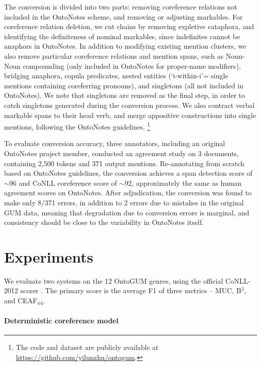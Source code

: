 \documentclass[11pt,a4paper]{article}
\begin{document}
The conversion is divided into two parts: removing coreference relations not included in the OntoNotes scheme, and removing or adjusting markables. For coreference relation deletion, we cut chains by removing expletive cataphora, and identifying the definiteness of nominal markables, since indefinites cannot be anaphors in OntoNotes. In addition to modifying existing mention clusters, we also remove particular coreference relations and mention spans, such as Noun-Noun compounding (only included in OntoNotes for proper-name modifiers), bridging anaphora, copula predicates, nested entities (`i-within-i'= single mentions containing coreferring pronouns), and singletons (all not included in OntoNotes). We note that singletons are removed as the final step, in order to catch singletons generated during the conversion process. We also contract verbal markable spans to their head verb, and merge appositive constructions into single mentions, following the OntoNotes guidelines.
\footnote{The code and dataset are publicly available at \url{https://github.com/yilunzhu/ontogum}.}

To evaluate conversion accuracy, three annotators, including an original OntoNotes project member, conducted an agreement study on 3 documents, containing 2,500 tokens and 371 output mentions. Re-annotating from scratch based on OntoNotes guidelines, the conversion achieves a span detection score of $\sim$96 and CoNLL coreference score of $\sim$92, approximately the same as human agreement scores on OntoNotes. After adjudication, the conversion was found to make only 8/371 errors, in addition to 2 errors due to mistakes in the original GUM data, meaning that degradation due to conversion errors is marginal, and consistency should be close to the variability in OntoNotes itself.







\section{Experiments}
We evaluate two systems on the 12 OntoGUM genres, using the official CoNLL-2012 scorer \cite{pradhan-etal-2012-conll, pradhan-etal-2014-scoring}. The primary score is the average F1 of three metrics -- MUC, B$^3$, and CEAF$_{\phi4}$.

\paragraph{Deterministic coreference model}
\end{document}
